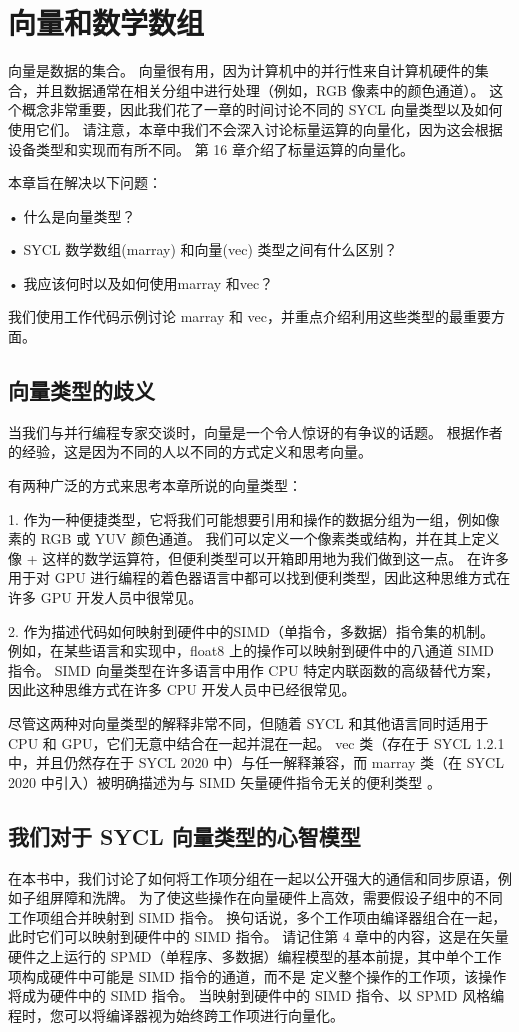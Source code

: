 \section{向量和数学数组}
向量是数据的集合。 向量很有用，因为计算机中的并行性来自计算机硬件的集合，并且数据通常在相关分组中进行处理（例如，RGB 像素中的颜色通道）。 这个概念非常重要，因此我们花了一章的时间讨论不同的 SYCL 向量类型以及如何使用它们。 请注意，本章中我们不会深入讨论标量运算的向量化，因为这会根据设备类型和实现而有所不同。 第 16 章介绍了标量运算的向量化。

本章旨在解决以下问题：

• 什么是向量类型？

• SYCL 数学数组(marray) 和向量(vec) 类型之间有什么区别？

• 我应该何时以及如何使用marray 和vec？

我们使用工作代码示例讨论 marray 和 vec，并重点介绍利用这些类型的最重要方面。

\subsection{向量类型的歧义}
当我们与并行编程专家交谈时，向量是一个令人惊讶的有争议的话题。 根据作者的经验，这是因为不同的人以不同的方式定义和思考向量。

有两种广泛的方式来思考本章所说的向量类型：

1. 作为一种便捷类型，它将我们可能想要引用和操作的数据分组为一组，例如像素的 RGB 或 YUV 颜色通道。 我们可以定义一个像素类或结构，并在其上定义像 + 这样的数学运算符，但便利类型可以开箱即用地为我们做到这一点。 在许多用于对 GPU 进行编程的着色器语言中都可以找到便利类型，因此这种思维方式在许多 GPU 开发人员中很常见。

2. 作为描述代码如何映射到硬件中的SIMD（单指令，多数据）指令集的机制。 例如，在某些语言和实现中，float8 上的操作可以映射到硬件中的八通道 SIMD 指令。 SIMD 向量类型在许多语言中用作 CPU 特定内联函数的高级替代方案，因此这种思维方式在许多 CPU 开发人员中已经很常见。

尽管这两种对向量类型的解释非常不同，但随着 SYCL 和其他语言同时适用于 CPU 和 GPU，它们无意中结合在一起并混在一起。 vec 类（存在于 SYCL 1.2.1 中，并且仍然存在于 SYCL 2020 中）与任一解释兼容，而 marray 类（在 SYCL 2020 中引入）被明确描述为与 SIMD 矢量硬件指令无关的便利类型 。

\subsection{我们对于 SYCL 向量类型的心智模型}
在本书中，我们讨论了如何将工作项分组在一起以公开强大的通信和同步原语，例如子组屏障和洗牌。 为了使这些操作在向量硬件上高效，需要假设子组中的不同工作项组合并映射到 SIMD 指令。 换句话说，多个工作项由编译器组合在一起，此时它们可以映射到硬件中的 SIMD 指令。 请记住第 4 章中的内容，这是在矢量硬件之上运行的 SPMD（单程序、多数据）编程模型的基本前提，其中单个工作项构成硬件中可能是 SIMD 指令的通道，而不是 定义整个操作的工作项，该操作将成为硬件中的 SIMD 指令。 当映射到硬件中的 SIMD 指令、以 SPMD 风格编程时，您可以将编译器视为始终跨工作项进行向量化。

